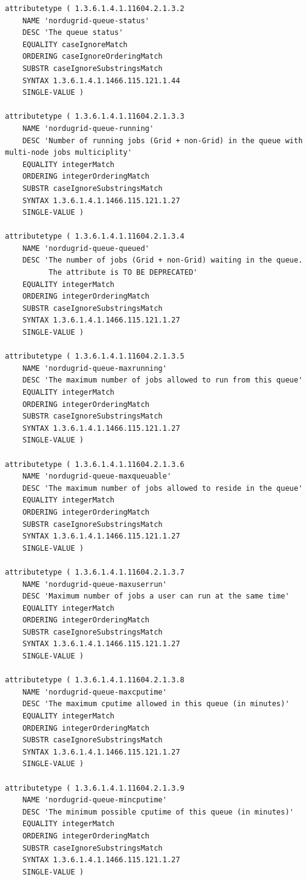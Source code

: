 \documentclass{article}
\begin{document}
\begin{verbatim}
attributetype ( 1.3.6.1.4.1.11604.2.1.3.2
    NAME 'nordugrid-queue-status'
    DESC 'The queue status'
    EQUALITY caseIgnoreMatch
    ORDERING caseIgnoreOrderingMatch
    SUBSTR caseIgnoreSubstringsMatch
    SYNTAX 1.3.6.1.4.1.1466.115.121.1.44
    SINGLE-VALUE )

attributetype ( 1.3.6.1.4.1.11604.2.1.3.3
    NAME 'nordugrid-queue-running'
    DESC 'Number of running jobs (Grid + non-Grid) in the queue with multi-node jobs multiciplity'
    EQUALITY integerMatch
    ORDERING integerOrderingMatch
    SUBSTR caseIgnoreSubstringsMatch
    SYNTAX 1.3.6.1.4.1.1466.115.121.1.27
    SINGLE-VALUE )

attributetype ( 1.3.6.1.4.1.11604.2.1.3.4
    NAME 'nordugrid-queue-queued'
    DESC 'The number of jobs (Grid + non-Grid) waiting in the queue.
          The attribute is TO BE DEPRECATED'
    EQUALITY integerMatch
    ORDERING integerOrderingMatch
    SUBSTR caseIgnoreSubstringsMatch
    SYNTAX 1.3.6.1.4.1.1466.115.121.1.27
    SINGLE-VALUE )

attributetype ( 1.3.6.1.4.1.11604.2.1.3.5
    NAME 'nordugrid-queue-maxrunning'
    DESC 'The maximum number of jobs allowed to run from this queue'
    EQUALITY integerMatch
    ORDERING integerOrderingMatch
    SUBSTR caseIgnoreSubstringsMatch
    SYNTAX 1.3.6.1.4.1.1466.115.121.1.27
    SINGLE-VALUE )

attributetype ( 1.3.6.1.4.1.11604.2.1.3.6
    NAME 'nordugrid-queue-maxqueuable'
    DESC 'The maximum number of jobs allowed to reside in the queue'
    EQUALITY integerMatch
    ORDERING integerOrderingMatch
    SUBSTR caseIgnoreSubstringsMatch
    SYNTAX 1.3.6.1.4.1.1466.115.121.1.27
    SINGLE-VALUE )

attributetype ( 1.3.6.1.4.1.11604.2.1.3.7
    NAME 'nordugrid-queue-maxuserrun'
    DESC 'Maximum number of jobs a user can run at the same time'
    EQUALITY integerMatch
    ORDERING integerOrderingMatch
    SUBSTR caseIgnoreSubstringsMatch
    SYNTAX 1.3.6.1.4.1.1466.115.121.1.27
    SINGLE-VALUE )

attributetype ( 1.3.6.1.4.1.11604.2.1.3.8
    NAME 'nordugrid-queue-maxcputime'
    DESC 'The maximum cputime allowed in this queue (in minutes)'
    EQUALITY integerMatch
    ORDERING integerOrderingMatch
    SUBSTR caseIgnoreSubstringsMatch
    SYNTAX 1.3.6.1.4.1.1466.115.121.1.27
    SINGLE-VALUE )

attributetype ( 1.3.6.1.4.1.11604.2.1.3.9
    NAME 'nordugrid-queue-mincputime'
    DESC 'The minimum possible cputime of this queue (in minutes)'
    EQUALITY integerMatch
    ORDERING integerOrderingMatch
    SUBSTR caseIgnoreSubstringsMatch
    SYNTAX 1.3.6.1.4.1.1466.115.121.1.27
    SINGLE-VALUE )


\end{verbatim}
\end{document}
